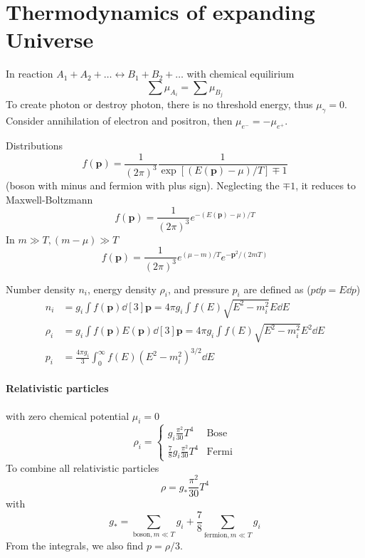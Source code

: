 \documentclass[12pt, a4paper, DIV=15]{article}
\numberwithin{equation}{section}
\begin{document}
\section{Thermodynamics of expanding Universe}
In reaction $A_1 + A_2 + \dots \leftrightarrow B_1 + B_2 + \dots$ with chemical equilirium
\begin{equation}
   \sum \mu_{A_i} = \sum \mu_{B_j}
\end{equation}
To create photon or destroy photon, there is no threshold energy, thus $\mu_\gamma = 0$. Consider annihilation of electron and positron, then $\mu_{e^-} = - \mu_{e^+}$.

Distributions
\begin{equation}
   f(\pmb{p}) = \frac{1}{(2\pi)^3} \frac{1}{\exp[(E(\pmb{p})-\mu)/T]  \mp 1} \label{dist}
\end{equation}
(boson with minus and fermion with plus sign). Neglecting the $\mp 1$, it reduces to Maxwell-Boltzmann 
\begin{equation}
   f(\pmb{p}) = \frac{1}{(2\pi)^3} e^{-(E(\pmb{p})-\mu)/T}
\end{equation}
In $m \gg T, (m - \mu) \gg T$
\begin{equation}
   f(\pmb{p}) = \frac{1}{(2\pi)^3} e^{(\mu - m)/T} e^{- \pmb{p}^2/(2mT)}
\end{equation}

Number density $n_i$, energy density $\rho_i$, and pressure $p_i$ are defined as ($p\dd{p} = E \dd{p}$)
\begin{align}
   n_i &= g_i \int f(\pmb{p}) \dd[3]{\pmb{p}} = 4\pi g_i \int f(E) \sqrt{E^2 - m_i^2} E \dd{E} \\
   \rho_i &= g_i \int f(\pmb{p}) E(\pmb{p}) \dd[3]{\pmb{p}} = 4\pi g_i \int f(E) \sqrt{E^2 - m_i^2} E^2 \dd{E} \\
   p_i &= \frac{4\pi g_i}{3} \int^\infty_0 f(E) (E^2 - m_i^2)^{3/2} \dd{E}
\end{align}

\paragraph{Relativistic particles} with zero chemical potential $\mu_i = 0$
\begin{equation}
   \rho_i = 
   \begin{cases}
      g_i \frac{\pi^2}{30} T^4 & \text{Bose} \\
      \frac{7}{8} g_i \frac{\pi^2}{30} T^4 & \text{Fermi}
   \end{cases}
\end{equation}
To combine all relativistic particles
\begin{equation}
   \rho = g_* \frac{\pi^2}{30} T^4
\end{equation}
with
\begin{equation}
   g_* = \sum_{\text{boson}, m \ll T} g_i + \frac{7}{8} \sum_{\text{fermion}, m \ll T} g_i
\end{equation}
From the integrals, we also find $p = \rho / 3$.
\end{document}
